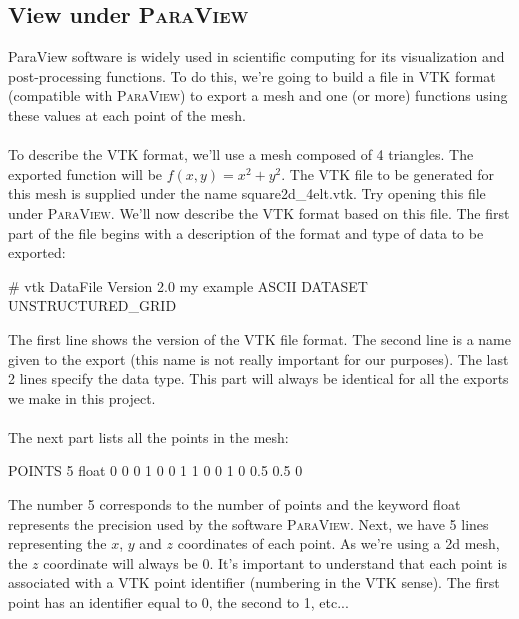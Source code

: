 \documentclass[english,10pt,a4paper]{article}
\begin{document}
\subsection{View under \textsc{ParaView}}
ParaView software is widely used in scientific computing for its visualization and post-processing functions.
To do this, we're going to build a file in VTK format (compatible with \textsc{ParaView}) to export a mesh and one (or more) functions using these values at each point of the mesh.

\paragraph{}
To describe the VTK format, we'll use a mesh composed of 4 triangles. The exported function will be $f(x,y)=x^2+y^2$.
The VTK file to be generated for this mesh is supplied under the name square2d\_4elt.vtk. Try opening this file under \textsc{ParaView}.
We'll now describe the VTK format based on this file.
The first part of the file begins with a description of the format and type of data to be exported:
\begin{mycpplistingInTabular}{}
# vtk DataFile Version 2.0
my example
ASCII
DATASET UNSTRUCTURED_GRID
\end{mycpplistingInTabular}{}
The first line shows the version of the VTK file format.
The second line is a name given to the export (this name is not really important for our purposes).
The last 2 lines specify the data type.
This part will always be identical for all the exports we make in this project.

\paragraph{}
The next part lists all the points in the mesh:
\begin{mycpplistingInTabular}{}
POINTS 5 float
0 0 0
1 0 0
1 1 0
0 1 0
0.5 0.5 0
\end{mycpplistingInTabular}
The number 5 corresponds to the number of points and the keyword float represents the precision used by the software \textsc{ParaView}.
Next, we have 5 lines representing the $x$, $y$ and $z$ coordinates of each point. As we're using a 2d mesh, the $z$ coordinate will always be 0.
It's important to understand that each point is associated with a VTK point identifier (numbering in the VTK sense). The first point has an identifier equal to 0, the second to 1, etc...
\end{document}
